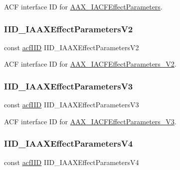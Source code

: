 A\+CF interface ID for \mbox{\hyperlink{a01669}{A\+A\+X\+\_\+\+I\+A\+C\+F\+Effect\+Parameters}}. 

\mbox{\label{a00683_a71e92973a70cd9f2fc704b2cf36a5b9a}} 
\subsubsection{\texorpdfstring{IID\_IAAXEffectParametersV2}{IID\_IAAXEffectParametersV2}}
{\footnotesize\ttfamily const \mbox{\hyperlink{a00269_a59df0b41744eee7a066787aaedf97f67}{acf\+I\+ID}} I\+I\+D\+\_\+\+I\+A\+A\+X\+Effect\+Parameters\+V2}



A\+CF interface ID for \mbox{\hyperlink{a01677}{A\+A\+X\+\_\+\+I\+A\+C\+F\+Effect\+Parameters\+\_\+\+V2}}. 

\mbox{\label{a00683_ad49630ca225ea71d751debb379d04192}} 
\subsubsection{\texorpdfstring{IID\_IAAXEffectParametersV3}{IID\_IAAXEffectParametersV3}}
{\footnotesize\ttfamily const \mbox{\hyperlink{a00269_a59df0b41744eee7a066787aaedf97f67}{acf\+I\+ID}} I\+I\+D\+\_\+\+I\+A\+A\+X\+Effect\+Parameters\+V3}



A\+CF interface ID for \mbox{\hyperlink{a01681}{A\+A\+X\+\_\+\+I\+A\+C\+F\+Effect\+Parameters\+\_\+\+V3}}. 

\mbox{\label{a00683_a852f037a3570b88ca1df6186bb524460}} 
\subsubsection{\texorpdfstring{IID\_IAAXEffectParametersV4}{IID\_IAAXEffectParametersV4}}
{\footnotesize\ttfamily const \mbox{\hyperlink{a00269_a59df0b41744eee7a066787aaedf97f67}{acf\+I\+ID}} I\+I\+D\+\_\+\+I\+A\+A\+X\+Effect\+Parameters\+V4}




